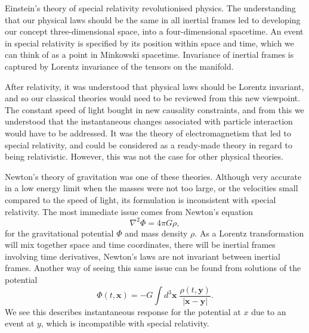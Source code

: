 Einstein's theory of special relativity revolutionised physics. The understanding that our physical laws should be the same in all inertial frames led to developing our concept three-dimensional space, into a four-dimensional spacetime. An event in special relativity is specified by its position within space and time, which we can think of as a point in Minkowski spacetime. Invariance of inertial frames is captured by Lorentz invariance of the tensors on the manifold.

After relativity, it was understood that physical laws should be Lorentz invariant, and so our classical theories would need to be reviewed from this new viewpoint. The constant speed of light bought in new causality constraints, and from this we understood that the instantaneous changes associated with particle interaction would have to be addressed. It was the theory of electromagnetism that led to special relativity, and could be considered as a ready-made theory in regard to being relativistic. However, this was not the case for other physical theories.  

Newton's theory of gravitation was one of these theories. Although very accurate in a low energy limit when the masses were not too large, or the velocities small compared to the speed of light, its formulation is inconsistent with special relativity. The most immediate issue comes from Newton's equation
\begin{equation*}
	\nabla^2 \Phi = 4\pi G \rho,
\end{equation*}
for the gravitational potential $\Phi$ and mass density $\rho$. As a Lorentz transformation will mix together space and time coordinates, there will be inertial frames involving time derivatives, \ie Newton's laws are not invariant between inertial frames. Another way of seeing this same issue can be found from solutions of the potential
\begin{equation*}
  \Phi(t,\mathbf{x}) = -G \int d^3 \mathbf{x} \; \frac{\rho(t,\mathbf{y})}{| \mathbf{x} - \mathbf{y} |}.
\end{equation*}
We see this describes instantaneous response for the potential at $x$ due to an event at $y$, which is incompatible with special relativity.

